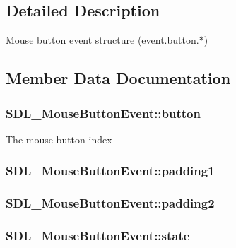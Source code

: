 \subsection{Detailed Description}
Mouse button event structure (event.\-button.$\ast$) 

\subsection{Member Data Documentation}
\hypertarget{struct_s_d_l___mouse_button_event_a1a4680e19ae06d02d2093f0bcba1b24c}{
\subsubsection[{button}]{ S\-D\-L\-\_\-\-Mouse\-Button\-Event\-::button}}\label{struct_s_d_l___mouse_button_event_a1a4680e19ae06d02d2093f0bcba1b24c}
The mouse button index \hypertarget{struct_s_d_l___mouse_button_event_a765957d218d16fa00558fa4d20e80689}{
\subsubsection[{padding1}]{ S\-D\-L\-\_\-\-Mouse\-Button\-Event\-::padding1}}\label{struct_s_d_l___mouse_button_event_a765957d218d16fa00558fa4d20e80689}
\hypertarget{struct_s_d_l___mouse_button_event_a344c3f10b6d7c60394fa55c7001e72a8}{
\subsubsection[{padding2}]{ S\-D\-L\-\_\-\-Mouse\-Button\-Event\-::padding2}}\label{struct_s_d_l___mouse_button_event_a344c3f10b6d7c60394fa55c7001e72a8}
\hypertarget{struct_s_d_l___mouse_button_event_a8809cef85cfffad4f2059f2ba4fc6a3d}{
\subsubsection[{state}]{ S\-D\-L\-\_\-\-Mouse\-Button\-Event\-::state}}\label{struct_s_d_l___mouse_button_event_a8809cef85cfffad4f2059f2ba4fc6a3d}
